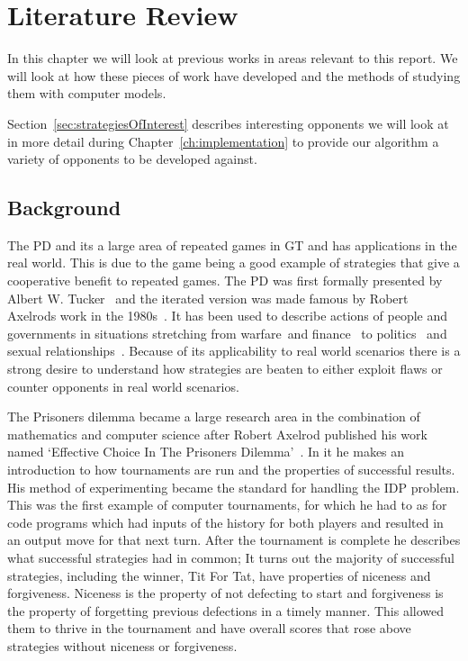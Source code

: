 
\chapter{Literature Review}\label{ch:literature}
In this chapter we will look at previous works in areas relevant to this report.
We will look at how these pieces of work have developed and the methods of studying them with computer models. 


Section~\ref{sec:strategiesOfInterest} describes interesting opponents we will look at in more detail during Chapter~\ref{ch:implementation} to provide our algorithm a variety of opponents to be developed against.

\section{Background}\label{sec:background}
The PD and its a large area of repeated games in GT and has applications in the real world.
This is due to the game being a good example of strategies that give a cooperative benefit to repeated games.
The PD was first formally presented by Albert W. Tucker~\cite{cambell2016thesis, gass2005annotated} and the iterated version was made famous by Robert Axelrods work in the 1980s~\cite{axelrod1980effective}.
It has been used to describe actions of people and governments in situations stretching from warfare~\cite{tooby1988war,aumann1992handbook}and finance~\cite{cable1997finance} to politics~\cite{snidal1985Politics} and sexual relationships~\cite{low2015sex}.
Because of its applicability to real world scenarios there is a strong desire to understand how strategies are beaten to either exploit flaws or counter opponents in real world scenarios.

The Prisoners dilemma became a large research area in the combination of mathematics and computer science after Robert Axelrod published his work named `Effective Choice In The Prisoners Dilemma'~\cite{axelrod1980effective}.
In it he makes an introduction to how tournaments are run and the properties of successful results.
His method of experimenting became the standard for handling the IDP problem.
This was the first example of computer tournaments, for which he had to as for code programs which had inputs of the history for both players and resulted in an output move for that next turn.
After the tournament is complete he describes what successful strategies had in common; 
It turns out the majority of successful strategies, including the winner, Tit For Tat, have properties of niceness and forgiveness.
Niceness is the property of not defecting to start and forgiveness is the property of forgetting previous defections in a timely manner.
This allowed them to thrive in the tournament and have overall scores that rose above strategies without niceness or forgiveness.

